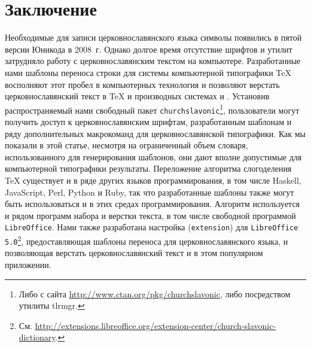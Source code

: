 \documentclass[12pt,a4paper,oneside]{extarticle}
\begin{document}
\section{Заключение}

Необходимые для записи церковнославянского языка символы появились в пятой версии Юникода в 2008~г. Однако долгое время отсутствие шрифтов и утилит затрудняло работу с церковнославянским текстом на компьютере. Разработанные нами шаблоны переноса строки для системы компьютерной типографики \TeX{} восполняют этот пробел в компьютерных технология и позволяют верстать церковнославянский текст в \TeX{} и производных системах \XeTeX{} и \LuaTeX{}. Установив распространяемый нами свободный пакет \verb+churchslavonic+\footnote{Либо с сайта \url{http://www.ctan.org/pkg/churchslavonic}, либо посредством утилиты tlrmgr.}, пользователи могут получить доступ к церковнославянским шрифтам, разработанным шаблонам и ряду дополнительных макрокоманд для церковнославянской типографики. Как мы показали в этой статье, несмотря на ограниченный объем словаря, использованного для генерирования шаблонов, они дают вполне допустимые для компьютерной типографики результаты. Переложение алгоритма слогоделения \TeX{}  существует и в ряде других языков программирования, в том числе Haskell, JavaScript, Perl, Python и Ruby, так что разработанные шаблоны также могут быть использоваться и в этих средах программирования. Алгоритм используется и рядом программ набора и верстки текста, в том числе свободной программой \verb+LibreOffice+. Нами также разработана настройка (\verb+extension+) для \verb+LibreOffice 5.0+\footnote{См. \url{http://extensions.libreoffice.org/extension-center/church-slavonic-dictionary}.}, предоставляющая шаблоны переноса для церковнославянского языка, и позволяющая верстать церковнославянский текст и в этом популярном приложении.

\printbibliography
\end{document}
